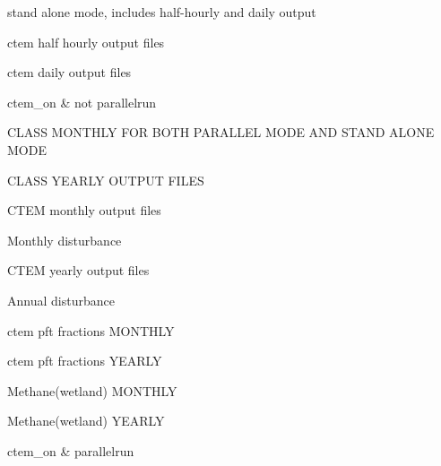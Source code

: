 stand alone mode, includes half-\/hourly and daily output

ctem half hourly output files

ctem daily output files

ctem\+\_\+on \& not parallelrun

C\+L\+A\+S\+S M\+O\+N\+T\+H\+L\+Y F\+O\+R B\+O\+T\+H P\+A\+R\+A\+L\+L\+E\+L M\+O\+D\+E A\+N\+D S\+T\+A\+N\+D A\+L\+O\+N\+E M\+O\+D\+E

C\+L\+A\+S\+S Y\+E\+A\+R\+L\+Y O\+U\+T\+P\+U\+T F\+I\+L\+E\+S

C\+T\+E\+M monthly output files

Monthly disturbance

C\+T\+E\+M yearly output files

Annual disturbance

ctem pft fractions M\+O\+N\+T\+H\+L\+Y

ctem pft fractions Y\+E\+A\+R\+L\+Y

Methane(wetland) M\+O\+N\+T\+H\+L\+Y

Methane(wetland) Y\+E\+A\+R\+L\+Y

ctem\+\_\+on \& parallelrun 